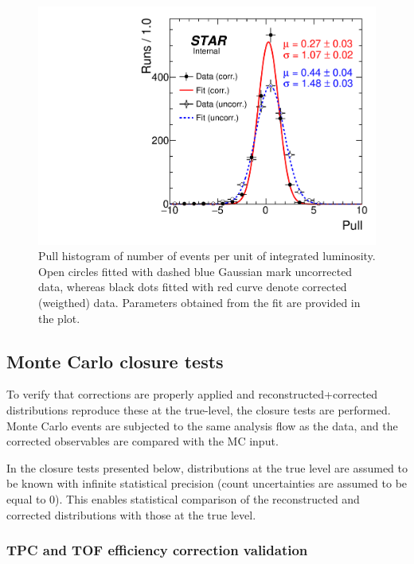 \begin{figure}[ht!]
\centering%
\parbox{0.4725\textwidth}{%
  \centering%
  \includegraphics[width=\linewidth]{graphics/corrections/PullC.pdf}
}%
\quad%
\parbox{0.4725\textwidth}{%
    \caption[Pull histogram of number of events per unit of integrated luminosity.]{Pull histogram of number of events per unit of integrated luminosity. Open circles fitted with dashed blue Gaussian mark uncorrected data, whereas black dots fitted with red curve denote corrected (weigthed) data. Parameters obtained from the fit are provided in the plot.}\label{fig:pull}%
}
\end{figure}

\subsection{Monte Carlo closure tests}\label{subsec:mcClosure}

To verify that corrections are properly applied and reconstructed+corrected distributions reproduce these at the true-level, the closure tests are performed. Monte Carlo events are subjected to the same analysis flow as the data, and the corrected observables are compared with the MC input.

In the closure tests presented below, distributions at the true level are assumed to be known with infinite statistical precision (count uncertainties are assumed to be equal to 0). This enables statistical comparison of the reconstructed and corrected distributions with those at the true level.

\subsubsection{TPC and TOF efficiency correction validation}\label{subsec:closureTestTpcTof}

